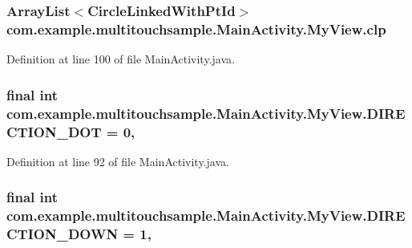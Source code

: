 \subsubsection[{clp}]{\setlength{\rightskip}{0pt plus 5cm}Array\+List$<${\bf Circle\+Linked\+With\+Pt\+Id}$>$ com.\+example.\+multitouchsample.\+Main\+Activity.\+My\+View.\+clp\hspace{0.3cm}{\ttfamily [private]}}\label{classcom_1_1example_1_1multitouchsample_1_1_main_activity_1_1_my_view_a3bbc2d3fe569814080fe27c6c64eca77}


Definition at line 100 of file Main\+Activity.\+java.

\hypertarget{classcom_1_1example_1_1multitouchsample_1_1_main_activity_1_1_my_view_ad91938a7ac9667ccd247a072f338a2de}{}
\subsubsection[{D\+I\+R\+E\+C\+T\+I\+O\+N\+\_\+\+D\+O\+T}]{\setlength{\rightskip}{0pt plus 5cm}final int com.\+example.\+multitouchsample.\+Main\+Activity.\+My\+View.\+D\+I\+R\+E\+C\+T\+I\+O\+N\+\_\+\+D\+O\+T = 0\hspace{0.3cm}{\ttfamily [static]}, {\ttfamily [private]}}\label{classcom_1_1example_1_1multitouchsample_1_1_main_activity_1_1_my_view_ad91938a7ac9667ccd247a072f338a2de}


Definition at line 92 of file Main\+Activity.\+java.

\hypertarget{classcom_1_1example_1_1multitouchsample_1_1_main_activity_1_1_my_view_afc3ae0a948391b36141f78c515622217}{}
\subsubsection[{D\+I\+R\+E\+C\+T\+I\+O\+N\+\_\+\+D\+O\+W\+N}]{\setlength{\rightskip}{0pt plus 5cm}final int com.\+example.\+multitouchsample.\+Main\+Activity.\+My\+View.\+D\+I\+R\+E\+C\+T\+I\+O\+N\+\_\+\+D\+O\+W\+N = 1\hspace{0.3cm}{\ttfamily [static]}, {\ttfamily [private]}}\label{classcom_1_1example_1_1multitouchsample_1_1_main_activity_1_1_my_view_afc3ae0a948391b36141f78c515622217}


